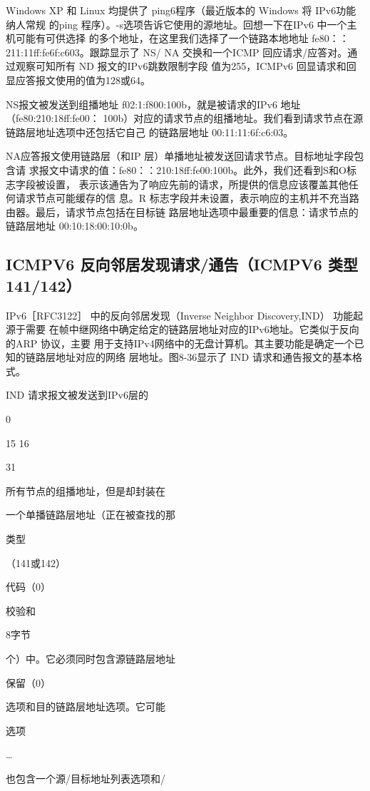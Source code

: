 Windows XP 和 Linux 均提供了 ping6程序（最近版本的 Windows 将 IPv6功能纳人常规
的ping 程序）。-s选项告诉它使用的源地址。回想一下在IPv6 中一个主机可能有可供选择
的多个地址，在这里我们选择了一个链路本地地址 fe80：：211:11ff:fe6f:c603。跟踪显示了 NS/
NA 交换和一个ICMP 回应请求/应答对。通过观察可知所有 ND 报文的IPv6跳数限制字段
值为255，ICMPv6 回显请求和回显应答报文使用的值为128或64。

NS报文被发送到组播地址 f02:1:f800:100b，就是被请求的IPv6 地址 （fe80:210:18ff:fe00：
100b）对应的请求节点的组播地址。我们看到请求节点在源链路层地址选项中还包括它自己
的链路层地址 00:11:11:6f:c6:03。

NA应答报文使用链路层（和IP 层）单播地址被发送回请求节点。目标地址字段包含请
求报文中请求的值：fe80：：210:18ff:fe00:100b。此外，我们还看到S和O标志字段被设置，
表示该通告为了响应先前的请求，所提供的信息应该覆盖其他任何请求节点可能缓存的信
息。R 标志字段并未设置，表示响应的主机并不充当路由器。最后，请求节点包括在目标链
路层地址选项中最重要的信息：请求节点的链路层地址 00:10:18:00:10:0b。

\subsection{ICMPV6 反向邻居发现请求/通告（ICMPV6 类型141/142）}

IPv6［RFC3122］ 中的反向邻居发现（Inverse Neighbor Discovery,IND） 功能起源于需要
在帧中继网络中确定给定的链路层地址对应的IPv6地址。它类似于反向的ARP 协议，主要
用于支持IPv4网络中的无盘计算机。其主要功能是确定一个已知的链路层地址对应的网络
层地址。图8-36显示了 IND 请求和通告报文的基本格式。

IND 请求报文被发送到IPv6层的

0

15 16

31

所有节点的组播地址，但是却封装在

一个单播链路层地址（正在被查找的那

类型

（141或142）

代码（0）

校验和

8字节

个）中。它必须同时包含源链路层地址

保留（0）

选项和目的链路层地址选项。它可能

选项

…

也包含一个源/目标地址列表选项和/

